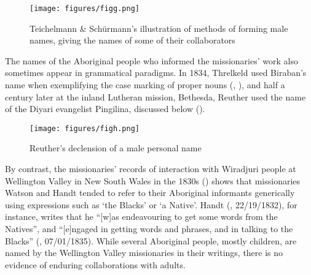 \begin{figure}
\texttt{[image: figures/figg.png]}
\caption{Teichelmann \& Schürmann’s illustration of methods of forming male names, giving the names of some of their collaborators \citep[36]{teichelmann_outlines_1840}}
\label{fig:key:1.1.3-7}
\end{figure} 

The names of the Aboriginal people who informed the missionaries’ work also sometimes appear in grammatical paradigms. In 1834, Threlkeld used Biraban’s name when exemplifying the case marking of proper nouns (, ), and half a century later at the inland Lutheran mission, Bethesda, Reuther used the name of the Diyari evangelist Pingilina, discussed below ().

\begin{figure}
\texttt{[image: figures/figh.png]}
\caption{Reuther’s declension of a male personal name \citep[13]{reuther_dieri_1894}}
\label{fig:key:1.1.3-8}
\end{figure} 

By contrast, the missionaries’ records of interaction with Wiradjuri people at Wellington Valley in New South Wales in the 1830s () shows that missionaries Watson and Handt tended to refer to their Aboriginal informants generically using expressions such as `the Blacks’ or `a Native'. Handt (\citeyear{handtpapers}, 22/19/1832), for instance, writes that he “[w]as endeavouring to get some words from the Natives”, and “[e]ngaged in getting words and phrases, and in talking to the Blacks” (\citealt{handtpapers}, 07/01/1835). While several Aboriginal people, mostly children, are named by the Wellington Valley missionaries in their writings, there is no evidence of enduring collaborations with adults. 

